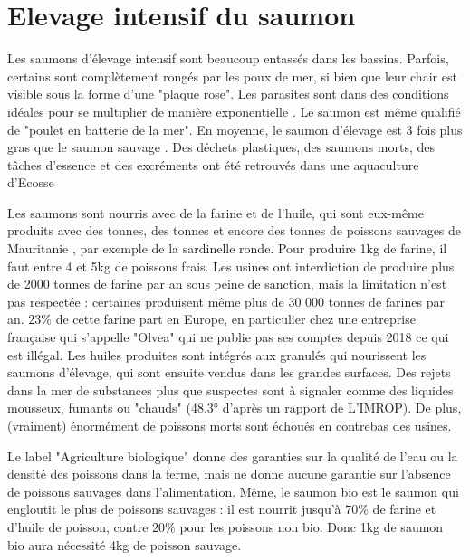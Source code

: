 \documentclass{article}
\begin{document}
\section{Elevage intensif du saumon}
Les saumons d'élevage intensif sont beaucoup entassés dans les bassins. Parfois, certains sont complètement rongés par les poux de mer, si bien que leur chair est visible sous la forme d'une "plaque rose".
Les parasites sont dans des conditions idéales pour se multiplier de manière exponentielle \cite{FRANCE24}. Le saumon est même qualifié de "poulet en batterie de la mer".
En moyenne, le saumon d'élevage est 3 fois plus gras que le saumon sauvage \cite{FT2}. Des déchets plastiques, des saumons morts, des tâches d'essence et des excréments ont été retrouvés dans une aquaculture d'Ecosse \cite{FT2}

Les saumons sont nourris avec de la farine et de l'huile, qui sont eux-même produits avec des tonnes, des tonnes et encore des tonnes de poissons sauvages de Mauritanie \cite{ARTE2}, par exemple de la sardinelle ronde.
Pour produire 1kg de farine, il faut entre 4 et 5kg de poissons frais. Les usines ont interdiction de produire plus de 2000 tonnes de farine par an sous peine de sanction, mais la limitation n'est pas respectée : certaines produisent même plus de 30 000 tonnes de farines par an.
$23 \%$ de cette farine part en Europe, en particulier chez une entreprise française qui s'appelle "Olvea" qui ne publie pas ses comptes depuis 2018 ce qui est illégal.
Les huiles produites sont intégrés aux granulés qui nourissent les saumons d'élevage, qui sont ensuite vendus dans les grandes surfaces.
Des rejets dans la mer de substances plus que suspectes sont à signaler comme des liquides mousseux, fumants ou "chauds" (48.3° d'après un rapport de L'IMROP). De plus, (vraiment) énormément de poissons morts sont échoués en contrebas des usines.

Le label "Agriculture biologique" donne des garanties sur la qualité de l'eau ou la densité des poissons dans la ferme, mais ne donne aucune garantie sur l'absence de poissons sauvages dans l'alimentation.
Même, le saumon bio est le saumon qui engloutit le plus de poissons sauvages : il est nourrit jusqu'à $70\%$ de farine et d'huile de poisson, contre $20\%$ pour les poissons non bio. Donc 1kg de saumon bio aura nécessité 4kg de poisson sauvage.
\end{document}
